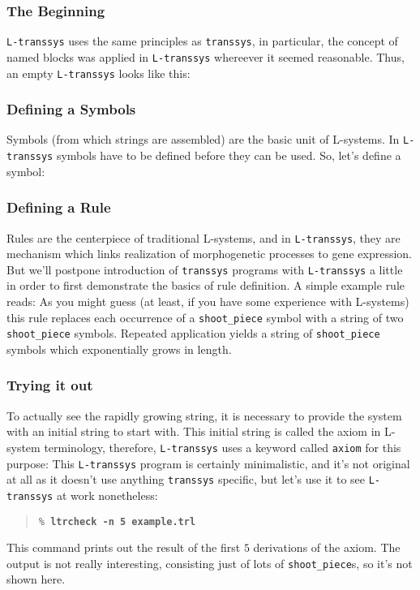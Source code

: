 \documentclass[12pt]{article}
\newcommand{\transsys}{\texttt{transsys}}
\newcommand{\ltranssys}{\texttt{L-}\transsys}
\newcommand{\codeword}[1]{\texttt{#1}}
\newcommand{\cmdline}[2][\% ]{\texttt{#1\textbf{#2}}}
\begin{document}
\subsubsection{The Beginning}

\ltranssys{} uses the same principles as
\transsys{}, in particular, the concept of named blocks was applied in
\ltranssys{} whereever it seemed reasonable. Thus, an empty
\ltranssys{} looks like this:


\subsubsection{Defining a Symbols}

Symbols (from which strings are assembled) are the basic unit of
L-systems. In \ltranssys{} symbols have to be defined before they can
be used. So, let's define a symbol:


\subsubsection{Defining a Rule}

Rules are the centerpiece of traditional L-systems, and in
\ltranssys{}, they are mechanism which links realization of
morphogenetic processes to gene expression. But we'll postpone
introduction of \transsys{} programs with \ltranssys{} a little in
order to first demonstrate the basics of rule definition. A simple
example rule reads:
As you might guess (at least, if you have some experience with
L-systems) this rule replaces each occurrence of a
\codeword{shoot\_piece} symbol with a string of two
\codeword{shoot\_piece} symbols. Repeated application yields a string
of \codeword{shoot\_piece} symbols which exponentially grows in length.


\subsubsection{Trying it out}

To actually see the rapidly growing string, it is necessary to provide
the system with an initial string to start with. This initial string
is called the axiom in L-system terminology, therefore, \ltranssys{}
uses a keyword called \codeword{axiom} for this purpose:
This \ltranssys{} program is certainly minimalistic, and it's not
original at all as it doesn't use anything \transsys{} specific, but
let's use it to see \ltranssys{} at work nonetheless:
\begin{quote}
\cmdline{ltrcheck -n 5 example.trl}
\end{quote}
This command prints out the result of the first $5$ derivations of the
axiom. The output is not really interesting, consisting just of lots
of \codeword{shoot\_piece}s, so it's not shown here.
\end{document}
